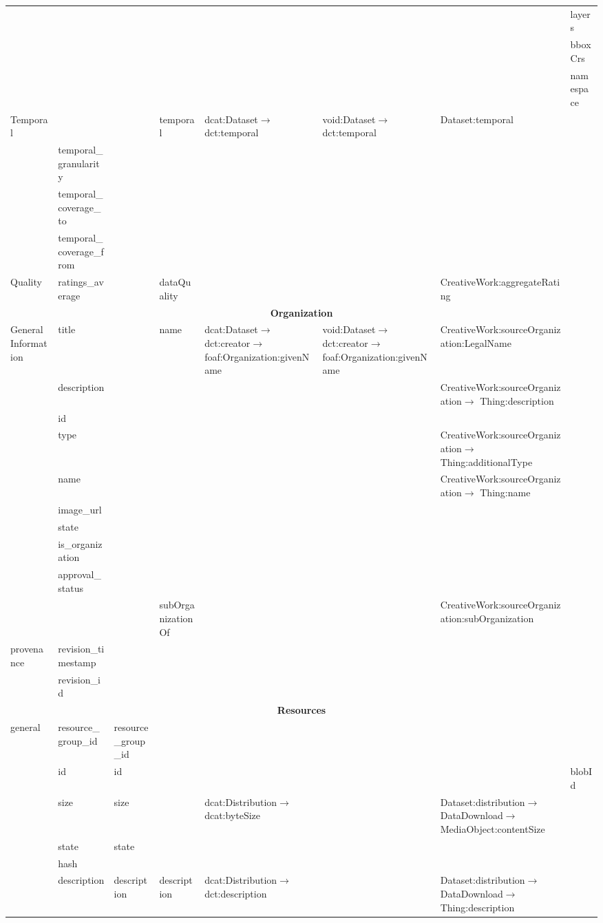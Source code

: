 \documentclass[runningheads,a4paper]{llncs}
\begin{document}
{\begin{landscape}
{\begin{longtable}{|p{1cm}|m{2.9cm}|m{2.4cm}|m{2.6cm}|p{3.8cm}|m{3.8cm}|m{6.5cm}|m{2.5cm}|}
 &  &  &  &  &  &  & layers\tabularnewline
\cline{2-8}
 &  &  &  &  &  &  & bboxCrs\tabularnewline
\cline{2-8}
 &  &  &  &  &  &  & namespace\tabularnewline
\hline
\multirow{4}{2cm}{Temporal} &  &  & temporal & dcat:Dataset$\rightarrow$ dct:temporal & void:Dataset$\rightarrow$ dct:temporal & Dataset:temporal & \tabularnewline
\cline{2-8}
 & temporal\_granularity &  &  &  &  &  & \tabularnewline
\cline{2-8}
 & temporal\_coverage\_to &  &  &  &  &  & \tabularnewline
\cline{2-8}
 & temporal\_coverage\_from &  &  &  &  &  & \tabularnewline
\hline
Quality & ratings\_average &  & dataQuality &  &  & CreativeWork:aggregateRating & \tabularnewline
\hline
\multicolumn{8}{|c|}{\cellcolor{blue!25}\textbf{Organization}}\tabularnewline
\hline
\multirow{10}{2cm}{General Information} & title &  & name & dcat:Dataset$\rightarrow$ dct:creator$\rightarrow$ foaf:Organization:givenName & void:Dataset$\rightarrow$ dct:creator$\rightarrow$ foaf:Organization:givenName & CreativeWork:sourceOrganization:LegalName & \tabularnewline
\cline{2-8}
 & description &  &  &  &  & CreativeWork:sourceOrganization$\rightarrow$ Thing:description & \tabularnewline
\cline{2-8}
 & id &  &  &  &  &  & \tabularnewline
\cline{2-8}
 & type &  &  &  &  & CreativeWork:sourceOrganization$\rightarrow$ Thing:additionalType & \tabularnewline
\cline{2-8}
 & name &  &  &  &  & CreativeWork:sourceOrganization$\rightarrow$ Thing:name & \tabularnewline
\cline{2-8}
 & image\_url &  &  &  &  &  & \tabularnewline
\cline{2-8}
 & state &  &  &  &  &  & \tabularnewline
\cline{2-8}
 & is\_organization &  &  &  &  &  & \tabularnewline
\cline{2-8}
 & approval\_status &  &  &  &  &  & \tabularnewline
\cline{2-8}
 &  &  & subOrganizationOf &  &  & CreativeWork:sourceOrganization:subOrganization & \tabularnewline
\multirow{2}{2cm}{provenance} & revision\_timestamp &  &  &  &  &  & \tabularnewline
\cline{2-8}
 & revision\_id &  &  &  &  &  & \tabularnewline
\hline
\multicolumn{8}{|c|}{\cellcolor{blue!25}\textbf{Resources}}\tabularnewline
\hline
\multirow{15}{2cm}{general} & resource\_group\_id & resource\_group\_id &  &  &  &  & \tabularnewline
\cline{2-8}
 & id & id &  &  &  &  & blobId\tabularnewline
\cline{2-8}
 & size & size &  & dcat:Distribution$\rightarrow$ dcat:byteSize &  & Dataset:distribution$\rightarrow$ DataDownload$\rightarrow$ MediaObject:contentSize & \tabularnewline
\cline{2-8}
 & state & state &  &  &  &  & \tabularnewline
\cline{2-8}
 & hash &  &  &  &  &  & \tabularnewline
\cline{2-8}
 & description & description & description & dcat:Distribution$\rightarrow$ dct:description &  & Dataset:distribution$\rightarrow$ DataDownload$\rightarrow$ Thing:description & \tabularnewline

\end{longtable}}
\end{landscape}}
\end{document}
